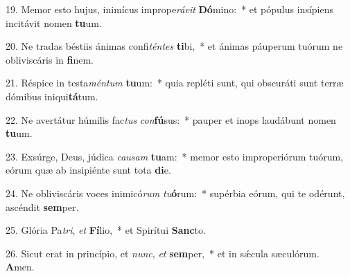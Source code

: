19. Memor esto hujus, inimícus imprope\textit{rá}\textit{vit} \textbf{Dó}mino:~*  et pópulus insípiens incitávit nomen \textbf{tu}um.\

20. Ne tradas béstiis ánimas confi\textit{tén}\textit{tes} \textbf{ti}bi,~*  et ánimas páuperum tuórum ne obliviscáris in \textbf{fi}nem.\

21. Réspice in testa\textit{mén}\textit{tum} \textbf{tu}um:~*  quia repléti sunt, qui obscuráti sunt terræ dómibus iniqui\textbf{tá}tum.\

22. Ne avertátur húmilis fac\textit{tus} \textit{con}\textbf{fú}sus:~*  pauper et inops laudábunt nomen \textbf{tu}um.\

23. Exsúrge, Deus, júdica \textit{cau}\textit{sam} \textbf{tu}am:~*  memor esto improperiórum tuórum, eórum quæ ab insipiénte sunt tota \textbf{di}e.\

24. Ne obliviscáris voces inimicó\textit{rum} \textit{tu}\textbf{ó}rum:~*  supérbia eórum, qui te odérunt, ascéndit \textbf{sem}per.\

25. Glória Pa\textit{tri}, \textit{et} \textbf{Fí}lio,~*  et Spirítui \textbf{Sanc}to.\

26. Sicut erat in princípio, et \textit{nunc}, \textit{et} \textbf{sem}per,~*  et in sǽcula sæculórum. \textbf{A}men.\

